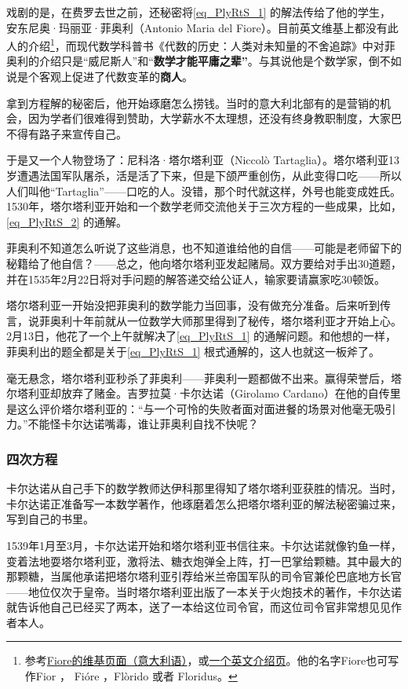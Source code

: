 戏剧的是，在费罗去世之前，还秘密将\autoref{eq_PlyRtS_1} 的解法传给了他的学生，安东尼奥·玛丽亚·菲奥利（Antonio Maria del Fiore）。目前英文维基上都没有此人的介绍\footnote{参考\href{https://es.wikipedia.org/wiki/Antonio_Maria_del_Fiore}{Fiore的维基页面（意大利语）}，或\href{https://second.wiki/wiki/antonio_maria_del_fiore}{一个英文介绍页}。他的名字Fiore也可写作Fior ， Fióre ，Flòrido 或者 Floridus。}，而现代数学科普书《代数的历史：人类对未知量的不舍追踪》中对菲奥利的介绍只是“威尼斯人”和“\textbf{数学才能平庸之辈”}。与其说他是个数学家，倒不如说是个客观上促进了代数变革的\textbf{商人}。

拿到方程解的秘密后，他开始琢磨怎么捞钱。当时的意大利北部有的是营销的机会，因为学者们很难得到赞助，大学薪水不太理想，还没有终身教职制度，大家巴不得有路子来宣传自己。

于是又一个人物登场了：尼科洛·塔尔塔利亚（Niccolò Tartaglia）。塔尔塔利亚13岁遭遇法国军队屠杀，活是活了下来，但是下颌严重创伤，从此变得口吃——所以人们叫他“Tartaglia”——口吃的人。没错，那个时代就这样，外号也能变成姓氏。1530年，塔尔塔利亚开始和一个数学老师交流他关于三次方程的一些成果，比如，\autoref{eq_PlyRtS_2} 的通解。

菲奥利不知道怎么听说了这些消息，也不知道谁给他的自信——可能是老师留下的秘籍给了他自信？——总之，他向塔尔塔利亚发起赌局。双方要给对手出30道题，并在1535年2月22日将对手问题的解答递交给公证人，输家要请赢家吃30顿饭。

塔尔塔利亚一开始没把菲奥利的数学能力当回事，没有做充分准备。后来听到传言，说菲奥利十年前就从一位数学大师那里得到了秘传，塔尔塔利亚才开始上心。2月13日，他花了一个上午就解决了\autoref{eq_PlyRtS_1} 的通解问题。和他想的一样，菲奥利出的题全都是关于\autoref{eq_PlyRtS_1} 根式通解的，这人也就这一板斧了。

毫无悬念，塔尔塔利亚秒杀了菲奥利——菲奥利一题都做不出来。赢得荣誉后，塔尔塔利亚却放弃了赌金。吉罗拉莫·卡尔达诺（Girolamo Cardano）在他的自传里是这么评价塔尔塔利亚的：“与一个可怜的失败者面对面进餐的场景对他毫无吸引力。”不能怪卡尔达诺嘴毒，谁让菲奥利自找不快呢？

\subsubsection{四次方程}

卡尔达诺从自己手下的数学教师达伊科那里得知了塔尔塔利亚获胜的情况。当时，卡尔达诺正准备写一本数学著作，他琢磨着怎么把塔尔塔利亚的解法秘密骗过来，写到自己的书里。

1539年1月至3月，卡尔达诺开始和塔尔塔利亚书信往来。卡尔达诺就像钓鱼一样，变着法地耍塔尔塔利亚，激将法、糖衣炮弹全上阵，打一巴掌给颗糖。其中最大的那颗糖，当属他承诺把塔尔塔利亚引荐给米兰帝国军队的司令官兼伦巴底地方长官——地位仅次于皇帝。当时塔尔塔利亚出版了一本关于火炮技术的著作，卡尔达诺就告诉他自己已经买了两本，送了一本给这位司令官，而这位司令官非常想见见作者本人。

